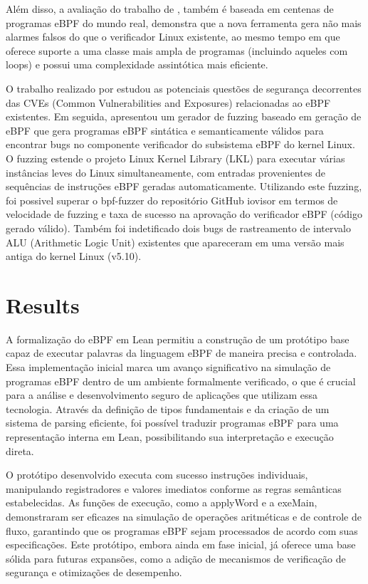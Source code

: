\documentclass[sigconf]{acmart}
\begin{document}
Além disso, a avaliação do trabalho de \cite{gershuni2019simple}, também é baseada em centenas de programas eBPF do mundo real, demonstra que a nova ferramenta gera não mais alarmes falsos do que o verificador Linux existente, ao mesmo tempo em que oferece suporte a uma classe mais ampla de programas (incluindo aqueles com loops) e possui uma complexidade assintótica mais eficiente.

O trabalho realizado por \cite{mohamed2023understanding} estudou as potenciais questões de segurança decorrentes das CVEs (Common Vulnerabilities and Exposures) relacionadas ao eBPF existentes. Em seguida, apresentou um gerador de fuzzing baseado em geração de eBPF que gera programas eBPF sintática e semanticamente válidos para encontrar bugs no componente verificador do subsistema eBPF do kernel Linux. O fuzzing estende o projeto Linux Kernel Library (LKL) para executar várias instâncias leves do Linux simultaneamente, com entradas provenientes de sequências de instruções eBPF geradas automaticamente. Utilizando este fuzzing, foi possivel superar o bpf-fuzzer do repositório GitHub iovisor em termos de velocidade de fuzzing e taxa de sucesso na aprovação do verificador eBPF (código gerado válido). Também foi indetificado dois bugs de rastreamento de intervalo ALU (Arithmetic Logic Unit) existentes que apareceram em uma versão mais antiga do kernel Linux (v5.10).

\section{Results}

A formalização do eBPF em Lean permitiu a construção de um protótipo base capaz de executar palavras da linguagem eBPF de maneira precisa e controlada. Essa implementação inicial marca um avanço significativo na simulação de programas eBPF dentro de um ambiente formalmente verificado, o que é crucial para a análise e desenvolvimento seguro de aplicações que utilizam essa tecnologia. Através da definição de tipos fundamentais e da criação de um sistema de parsing eficiente, foi possível traduzir programas eBPF para uma representação interna em Lean, possibilitando sua interpretação e execução direta.

O protótipo desenvolvido executa com sucesso instruções individuais, manipulando registradores e valores imediatos conforme as regras semânticas estabelecidas. As funções de execução, como a applyWord e a exeMain, demonstraram ser eficazes na simulação de operações aritméticas e de controle de fluxo, garantindo que os programas eBPF sejam processados de acordo com suas especificações. Este protótipo, embora ainda em fase inicial, já oferece uma base sólida para futuras expansões, como a adição de mecanismos de verificação de segurança e otimizações de desempenho.
\end{document}
